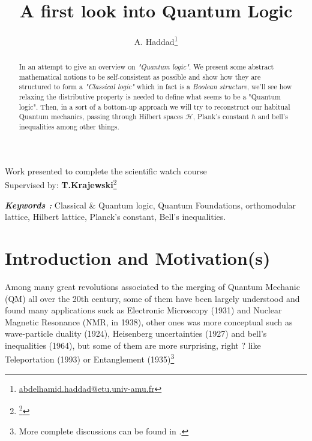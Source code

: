 \documentclass[12pt]{article}
\providecommand{\keywords}[1]
{
  \small	
  \textbf{\textit{Keywords :}} #1
}
\begin{document}
\begin{titlepage}
\title{\Huge{\textbf{A first look into Quantum Logic}}}
\author{{\large{A. Haddad}}\thanks{\href{mailto:abdelhamid.haddad@etu.univ-amu.fr}{abdelhamid.haddad@etu.univ-amu.fr}}}
\maketitle
\thispagestyle{empty}
\centering
\large Work presented to complete the scientific watch course \\	
\large Supervised by: \textbf{T.Krajewski}\footnote[2]{\thanks{\href{mailto:thomas.krajewski@cpt.univ-mrs.fr}{thomas.krajewski@cpt.univ-mrs.fr}}}
\vspace{2cm}
\begin{abstract}
\normalsize
\begin{spacing}{1.2}
In an attempt to give an overview on \textit{"Quantum logic"}. We present some abstract mathematical notions to be self-consistent as possible and show how they are structured to form a \textit{"Classical logic"} which in fact is a \textit{Boolean structure}, we'll see how relaxing the distributive property is needed to define what seems to be a "Quantum logic". Then, in a sort of a bottom-up approach we will try to reconstruct our habitual Quantum mechanics, passing through Hilbert spaces $\mathcal{H}$, Plank's constant $\hbar$ and bell's inequalities among other things.
\end{spacing}
\end{abstract}
\keywords{Classical \& Quantum logic, Quantum Foundations, orthomodular lattice, Hilbert lattice, Planck's constant, Bell's inequalities.}
\end{titlepage}
\clearpage
\renewcommand{\thefootnote}{\arabic{footnote}}
\setcounter{page}{2}
\section{Introduction and Motivation(s)}

Among many great revolutions associated to the merging of Quantum Mechanic (QM) all over the 20th century, some of them have been largely understood and found many applications suck as Electronic Microscopy (1931) and Nuclear Magnetic Resonance (NMR, in 1938), other ones was more conceptual such as wave-particle duality (1924), Heisenberg uncertainties (1927) and bell's inequalities (1964), but some of them are more surprising, right ? like Teleportation (1993) or Entanglement (1935)\footnote{More complete discussions can be found in \cite{manjit, omnes}.\label{footref}}
\end{document}
